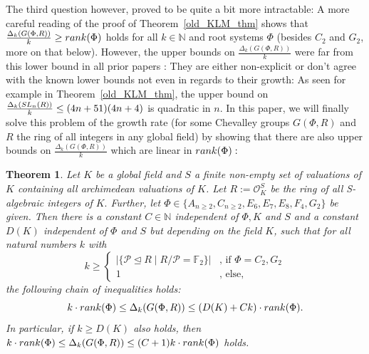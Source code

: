 \documentclass[12pt]{amsart}
\newcommand{\C}[1]{{\mathcal #1}}
\newtheorem{theorem}{Theorem}[section]
\theoremstyle{definition}\newtheorem{definition}[theorem]{Definition}
\theoremstyle{remark}\newtheorem{remark}[theorem]{Remark}
\theoremstyle{definition}\newtheorem{case}{Case}
\begin{document}
The third question however, proved to be quite a bit more intractable: A more careful reading of the proof of Theorem~\ref{old_KLM_thm} shows that $\frac{\Delta_k(G(\Phi,R))}{k}\geq {\rm rank}(\Phi)$ holds for all $k\in\mathbb{N}$ and root systems $\Phi$ \cite[Theorem~3]{explicit_strong_bound_sp_2n}(besides $C_2$ and $G_2$, more on that below). However, the upper bounds on $\frac{\Delta_k(G(\Phi,R))}{k}$ were far from this lower bound in all prior papers \cite{KLM,Chevalley_positive_char_tentative,explicit_strong_bound_sp_2n,General_strong_bound}: They are either non-explicit \cite{Chevalley_positive_char_tentative,General_strong_bound} or don't agree with the known lower bounds \cite{KLM,explicit_strong_bound_sp_2n} not even in regards to their growth: As seen for example in Theorem~\ref{old_KLM_thm}, the upper bound on $\frac{\Delta_k({\rm SL}_n(R))}{k}\leq (4n+51)(4n+4)$ is quadratic in $n$. In this paper, we will finally solve this problem of the growth rate (for some Chevalley groups $G(\Phi,R)$ and $R$ the ring of all integers in any global field) by showing that there are also upper bounds on $\frac{\Delta_k(G(\Phi,R))}{k}$ which are linear in ${\rm rank}(\Phi):$

\begin{theorem}\label{main_thm0}
Let $K$ be a global field and $S$ a finite non-empty set of valuations of $K$ containing all archimedean valuations of $K$. Let $R:=\mathscr{O}_K^S$ be the ring of all S-algebraic integers of $K.$ Further, let  $\Phi\in\{A_{n\geq 2},C_{n\geq 2},E_6,E_7,E_8,F_4,G_2\}$ be given. Then there is a constant $C\in\mathbb{N}$ independent of $\Phi,K$ and $S$ and a constant $D(K)$ independent of $\Phi$ and $S$ but depending on the field $K$, such that for all natural numbers $k$ with 
$$
k\geq 
\begin{cases}
|\{\C P\unlhd R\mid R/\C P=\mathbb{F}_2\}|&\text{, if }\Phi=C_2,G_2\\
1&\text{, else,}
\end{cases}
$$
the following chain of inequalities holds: 
$$
k\cdot{\rm rank}(\Phi)\leq\Delta_k(G(\Phi,R))\leq (D(K)+Ck)\cdot{\rm rank}(\Phi).
$$
In particular, if $k\geq D(K)$ also holds, then $k\cdot{\rm rank}(\Phi)\leq\Delta_k(G(\Phi,R))\leq (C+1)k\cdot{\rm rank}(\Phi)$ holds. 
\end{theorem}
\end{document}

